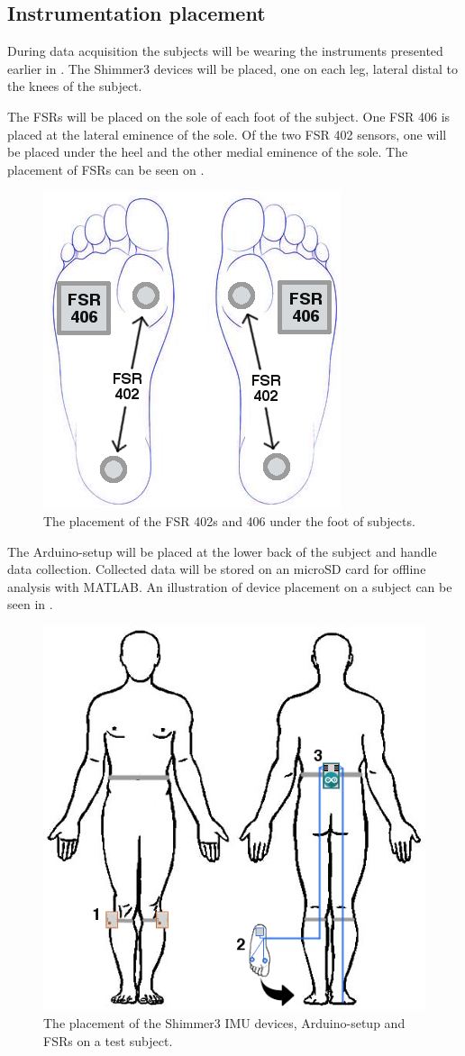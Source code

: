 \subsection{Instrumentation placement}

During data acquisition the subjects will be wearing the instruments presented earlier in . The Shimmer3 devices will be placed, one on each leg, lateral distal to the knees of the subject.

The FSRs will be placed on the sole of each foot of the subject. One FSR 406 is placed at the lateral eminence of the sole. Of the two FSR 402 sensors, one will be placed under the heel and the other medial eminence of the sole. The placement of FSRs can be seen on .

\begin{figure}[H]
	\includegraphics[width=.6\textwidth]{figures/humanSoleSensorPlacement}
	\caption{The placement of the FSR 402s and 406 under the foot of subjects.}
	\label{fig:soleSensorPlacement}  %
\end{figure}

The Arduino-setup will be placed at the lower back of the subject and handle data collection. Collected data will be stored on an microSD card for offline analysis with MATLAB. An illustration of device placement on a subject can be seen in .


\begin{figure}[H]
	\includegraphics[width=.6\textwidth]{figures/bodySysSetup}
	\caption{The placement of the Shimmer3 IMU devices, Arduino-setup and FSRs on a test subject.}
	\label{fig:bodySysSetup}  %
\end{figure}


